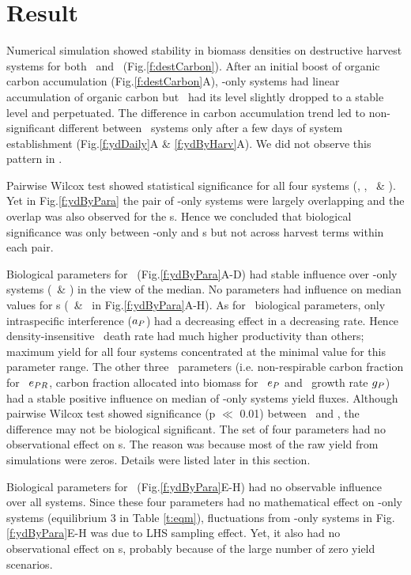 \documentclass[../thesis.tex]{subfiles} %
\begin{document}
\section{Result}
Numerical simulation showed stability in biomass densities on destructive harvest systems for both \PoN\ and \PBN\ (Fig.\ref{f:destCarbon}).  After an initial boost of organic carbon accumulation (Fig.\ref{f:destCarbon}A), \phy-only systems had linear accumulation of organic carbon but \pbs\ had its level slightly dropped to a stable level and perpetuated.  The difference in carbon accumulation trend led to non-significant different between \PoN\ systems only after a few days of system establishment (Fig.\ref{f:ydDaily}A \& \ref{f:ydByHarv}A).  We did not observe this pattern in \pbs.

Pairwise Wilcox test showed statistical significance for all four systems (\PBH, \PoH, \PBN\ \& \PoN).  Yet in Fig.\ref{f:ydByPara} the pair of \phy-only systems were largely overlapping and the overlap was also observed for the \pbs s.  Hence we concluded that biological significance was only between \phy-only and \pbs s but not across harvest terms within each pair.

Biological parameters for \phy\ (Fig.\ref{f:ydByPara}A-D) had stable influence over \phy-only systems (\PoH\ \& \PoN) in the view of the median.  No parameters had influence on median values for \pbs s (\PBH\ \& \PBN\ in Fig.\ref{f:ydByPara}A-H).  As for \phy\ biological parameters, only intraspecific interference ($a_P$) had a decreasing effect in a decreasing rate.  Hence density-insensitive \phy\ death rate had much higher productivity than others; maximum yield for all four systems concentrated at the minimal value for this parameter range.  The other three \phy\ parameters (i.e. non-respirable carbon fraction for \phy\ $e_{PR}$, carbon fraction allocated into biomass for \phy\ $e_P$ and \phy\ growth rate $g_P$) had a stable positive influence on median of \phy-only systems yield fluxes.  Although pairwise Wilcox test showed significance (p $\ll$ 0.01) between \PoH\ and \PoN, the difference may not be biological significant.  The set of four parameters had no observational effect on \pbs s.  The reason was because most of the raw yield from simulations were zeros.  Details were listed later in this section.

Biological parameters for \bac\ (Fig.\ref{f:ydByPara}E-H) had no observable influence over all systems.  Since these four parameters had no mathematical effect on \phy-only systems (equilibrium 3 in Table \ref{t:eqm}), fluctuations from \phy-only systems in Fig.\ref{f:ydByPara}E-H was due to LHS sampling effect.  Yet, it also had no observational effect on \pbs s, probably because of the large number of zero yield scenarios.
\end{document}
